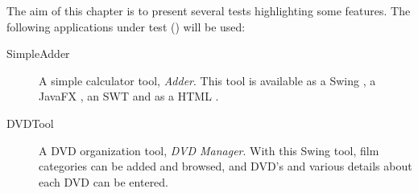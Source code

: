 
The aim of this chapter is to present several tests highlighting some features. The following applications under test (\gdauts) will be used:


\begin{description}
\item[SimpleAdder]{ A simple calculator tool, \emph{Adder}. This tool is available as a Swing \gdaut{}, a JavaFX \gdaut{}, an SWT \gdaut{} and as a HTML \gdaut{}. }
\item [DVDTool]{A DVD organization tool, \emph{DVD Manager}. With this Swing tool, film categories can be added and browsed, and DVD's and various details about each DVD can be entered.}  
\end{description}



